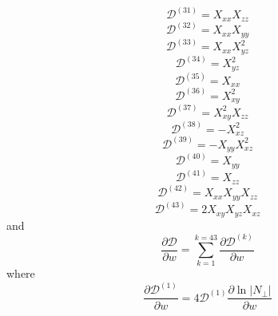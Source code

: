 \documentclass[a4paper,12pt]{article}%
\begin{document}
\begin{equation}
\mathcal{D}^{\left(  31\right)  }=X_{xx}X_{zz}%
\end{equation}%
\begin{equation}
\mathcal{D}^{\left(  32\right)  }=X_{xx}X_{yy}%
\end{equation}%
\begin{equation}
\mathcal{D}^{\left(  33\right)  }=X_{xx}X_{yz}^{2}%
\end{equation}%
\begin{equation}
\mathcal{D}^{\left(  34\right)  }=X_{yz}^{2}%
\end{equation}%
\begin{equation}
\mathcal{D}^{\left(  35\right)  }=X_{xx}%
\end{equation}%
\begin{equation}
\mathcal{D}^{\left(  36\right)  }=X_{xy}^{2}%
\end{equation}%
\begin{equation}
\mathcal{D}^{\left(  37\right)  }=X_{xy}^{2}X_{zz}%
\end{equation}%
\begin{equation}
\mathcal{D}^{\left(  38\right)  }=-X_{xz}^{2}%
\end{equation}%
\begin{equation}
\mathcal{D}^{\left(  39\right)  }=-X_{yy}X_{xz}^{2}%
\end{equation}%
\begin{equation}
\mathcal{D}^{\left(  40\right)  }=X_{yy}%
\end{equation}%
\begin{equation}
\mathcal{D}^{\left(  41\right)  }=X_{zz}%
\end{equation}%
\begin{equation}
\mathcal{D}^{\left(  42\right)  }=X_{xx}X_{yy}X_{zz}%
\end{equation}%
\begin{equation}
\mathcal{D}^{\left(  43\right)  }=2X_{xy}X_{yz}X_{xz}%
\end{equation}
and
\begin{equation}
\frac{\partial\mathcal{D}}{\partial w}=\sum_{k=1}^{k=43}\frac{\partial
\mathcal{D}^{\left(  k\right)  }}{\partial w}%
\end{equation}
where%
\begin{equation}
\frac{\partial\mathcal{D}^{\left(  1\right)  }}{\partial w}=4\mathcal{D}%
^{\left(  1\right)  }\frac{\partial\ln\left\vert N_{\bot}\right\vert
}{\partial w}%
\end{equation}%
\end{document}
